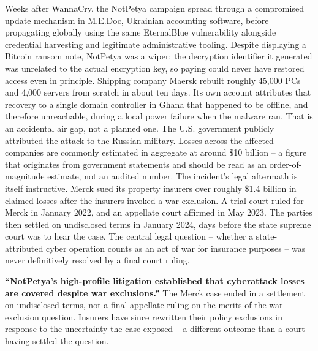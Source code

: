 \begin{example}
Weeks after WannaCry, the NotPetya campaign spread through a compromised update mechanism in
M.E.Doc, Ukrainian accounting software, before propagating globally using the same EternalBlue
vulnerability alongside credential harvesting and legitimate administrative tooling. Despite
displaying a Bitcoin ransom note, NotPetya was a wiper: the decryption identifier it generated was
unrelated to the actual encryption key, so paying could never have restored access even in
principle. Shipping company Maersk rebuilt roughly 45,000 PCs and 4,000 servers from scratch in
about ten days. Its own account attributes that recovery to a single domain
controller in Ghana that happened to be offline, and therefore unreachable, during a local power
failure when the malware ran. That is an accidental air gap, not a planned one. The U.S.
government publicly attributed the attack to the Russian military. Losses across
the affected companies are commonly estimated in aggregate at around \$10 billion -- a figure that
originates from government statements and should be read as an order-of-magnitude estimate, not
an audited number. The incident's legal aftermath is itself instructive. Merck sued its property
insurers over roughly \$1.4 billion in claimed losses after the insurers invoked a war exclusion.
A trial court ruled for Merck in January 2022, and an appellate court affirmed in May
2023. The parties then settled on undisclosed terms in January 2024, days before
the state supreme court was to hear the case. The central legal question -- whether a
state-attributed cyber operation counts as an act of war for insurance purposes -- was never
definitively resolved by a final court ruling.
\end{example}

\begin{misconception}
\textbf{``NotPetya's high-profile litigation established that cyberattack losses are covered
despite war exclusions.''} The Merck case ended in a settlement on undisclosed terms, not a final
appellate ruling on the merits of the war-exclusion question. Insurers have since rewritten their
policy exclusions in response to the uncertainty the case exposed -- a different outcome than a
court having settled the question.
\end{misconception}

